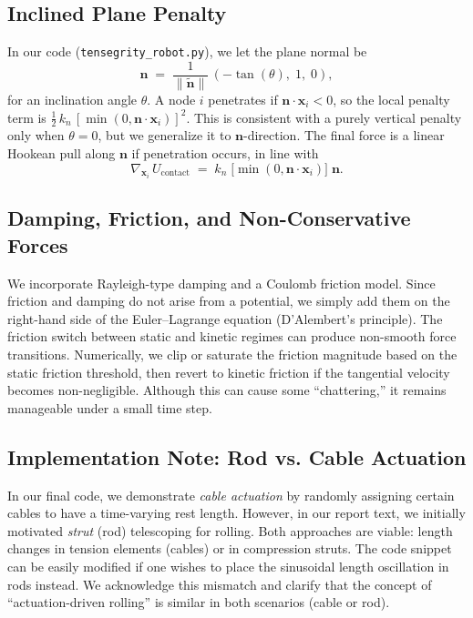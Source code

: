 \documentclass[12pt,letterpaper]{article}
\newcommand{\x}{\bm{x}}
\newcommand{\bfn}{\bm{n}}
\begin{document}
\subsection{Inclined Plane Penalty}
In our code (\texttt{tensegrity\_robot.py}), we let the plane normal be
\[
  \bfn \;=\; \frac{1}{\|\tilde{\bfn}\|}\,( -\tan(\theta),\; 1,\; 0 ),
\]
for an inclination angle $\theta$. A node $i$ penetrates if $\bfn \cdot \x_i < 0$, so the local penalty term is $\tfrac12\,k_n \,[\min(0,\bfn \cdot \x_i)]^2$. This is consistent with a purely vertical penalty only when $\theta=0$, but we generalize it to $\bfn$-direction. The final force is a linear Hookean pull along $\bfn$ if penetration occurs, in line with
\[
  \nabla_{\!\x_i}\,U_{\mathrm{contact}}
  \;=\; k_n\;\bigl[\min(0,\bfn\cdot\x_i)\bigr]\;\bfn.
\]

\subsection{Damping, Friction, and Non-Conservative Forces}
We incorporate Rayleigh-type damping and a Coulomb friction model. Since friction and damping do not arise from a potential, we simply add them on the right-hand side of the Euler--Lagrange equation (D'Alembert’s principle). The friction switch between static and kinetic regimes can produce non-smooth force transitions. Numerically, we clip or saturate the friction magnitude based on the static friction threshold, then revert to kinetic friction if the tangential velocity becomes non-negligible. Although this can cause some “chattering,” it remains manageable under a small time step.

\subsection{Implementation Note: Rod vs. Cable Actuation}
In our final code, we demonstrate \emph{cable actuation} by randomly assigning certain cables to have a time-varying rest length. However, in our report text, we initially motivated \emph{strut} (rod) telescoping for rolling. Both approaches are viable: length changes in tension elements (cables) or in compression struts. The code snippet can be easily modified if one wishes to place the sinusoidal length oscillation in rods instead. We acknowledge this mismatch and clarify that the concept of “actuation-driven rolling” is similar in both scenarios (cable or rod).
\end{document}
